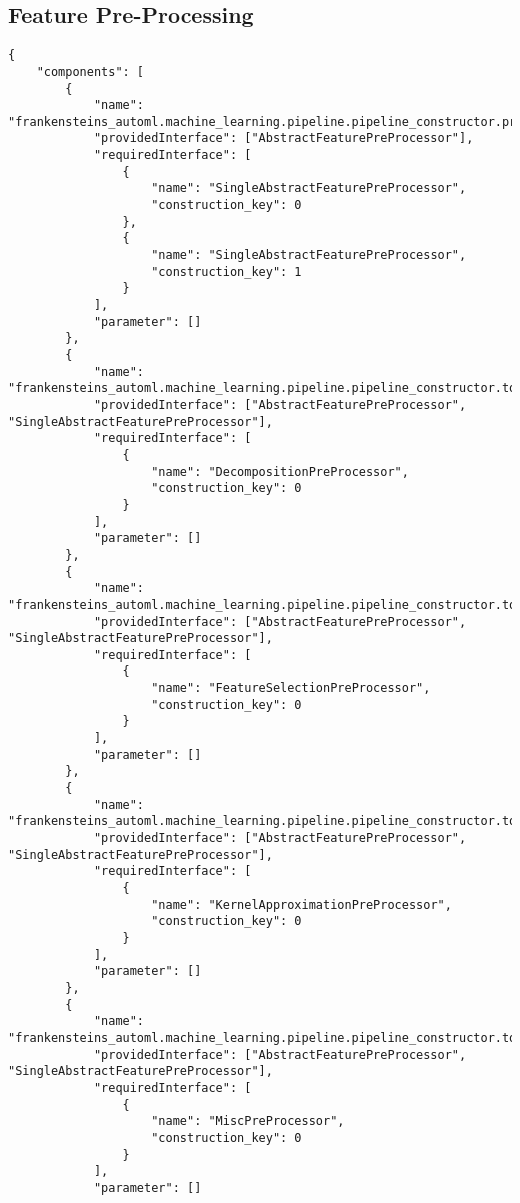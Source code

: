 \subsection{Feature Pre-Processing}
\begin{Verbatim}[fontsize=\scriptsize]
{
    "components": [
        {
            "name": "frankensteins_automl.machine_learning.pipeline.pipeline_constructor.preprocessor_union",
            "providedInterface": ["AbstractFeaturePreProcessor"],
            "requiredInterface": [
                {
                    "name": "SingleAbstractFeaturePreProcessor",
                    "construction_key": 0
                },
                {
                    "name": "SingleAbstractFeaturePreProcessor",
                    "construction_key": 1
                }
            ],
            "parameter": []
        },
        {
            "name": "frankensteins_automl.machine_learning.pipeline.pipeline_constructor.topology_union",
            "providedInterface": ["AbstractFeaturePreProcessor", "SingleAbstractFeaturePreProcessor"],
            "requiredInterface": [
                {
                    "name": "DecompositionPreProcessor",
                    "construction_key": 0
                }
            ],
            "parameter": []
        },
        {
            "name": "frankensteins_automl.machine_learning.pipeline.pipeline_constructor.topology_union",
            "providedInterface": ["AbstractFeaturePreProcessor", "SingleAbstractFeaturePreProcessor"],
            "requiredInterface": [
                {
                    "name": "FeatureSelectionPreProcessor",
                    "construction_key": 0
                }
            ],
            "parameter": []
        },
        {
            "name": "frankensteins_automl.machine_learning.pipeline.pipeline_constructor.topology_union",
            "providedInterface": ["AbstractFeaturePreProcessor", "SingleAbstractFeaturePreProcessor"],
            "requiredInterface": [
                {
                    "name": "KernelApproximationPreProcessor",
                    "construction_key": 0
                }
            ],
            "parameter": []
        },
        {
            "name": "frankensteins_automl.machine_learning.pipeline.pipeline_constructor.topology_union",
            "providedInterface": ["AbstractFeaturePreProcessor", "SingleAbstractFeaturePreProcessor"],
            "requiredInterface": [
                {
                    "name": "MiscPreProcessor",
                    "construction_key": 0
                }
            ],
            "parameter": []

\end{Verbatim}
